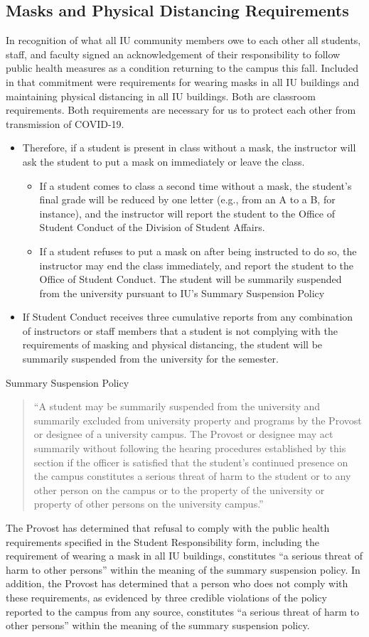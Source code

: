 \documentclass[12pt]{article} %
\begin{document}
\subsection{Masks and Physical Distancing Requirements}
In recognition of what all IU community members owe to each other all students, staff, and faculty signed an
acknowledgement of their responsibility to follow public health measures as a condition returning to the
campus this fall. Included in that commitment were requirements for wearing masks in all IU buildings and
maintaining physical distancing in all IU buildings. Both are classroom requirements.
Both requirements are necessary for us to protect each other from transmission of COVID-19.
\begin{itemize}
\item Therefore, if a student is present in class without a mask, the instructor will ask the student to put a
mask on immediately or leave the class.
\begin{itemize}
	\item If a student comes to class a second time without a mask, the student’s final grade will be reduced by one letter (e.g., from an A to a B, for instance), and the instructor will report the student to the Office of Student Conduct of the Division of Student Affairs.
	\item If a student refuses to put a mask on after being instructed to do so, the instructor may end the class immediately, and report the student to the Office of Student Conduct. The student will be summarily suspended from the university pursuant to IU’s Summary Suspension Policy
\end{itemize}
\item If Student Conduct receives three cumulative reports from any combination of instructors or staff
members that a student is not complying with the requirements of masking and physical distancing,
the student will be summarily suspended from the university for the semester.
\end{itemize}
Summary Suspension Policy
\begin{quotation}
“A student may be summarily suspended from the university and summarily excluded from university
property and programs by the Provost or designee of a university campus. The Provost or designee may
act summarily without following the hearing procedures established by this section if the officer is
satisfied that the student’s continued presence on the campus constitutes a serious threat of harm to the
student or to any other person on the campus or to the property of the university or property of other
persons on the university campus.”
\end{quotation}
The Provost has determined that refusal to comply with the public health requirements specified in the
Student Responsibility form, including the requirement of wearing a mask in all IU buildings, constitutes
“a serious threat of harm to other persons” within the meaning of the summary suspension policy. In
addition, the Provost has determined that a person who does not comply with these requirements, as
evidenced by three credible violations of the policy reported to the campus from any source, constitutes
“a serious threat of harm to other persons” within the meaning of the summary suspension policy.
\end{document}
